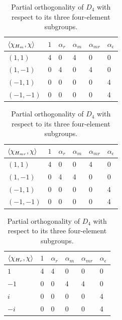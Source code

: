 \documentclass[two column]{article}
\begin{document}
\begin{table}[h]
\centering
\begin{tabular}{l|lllll}
  $\braket{\chi_{H_m}, \chi}$ & $1$ & $\alpha_{r}$ & $\alpha_{m}$ & $\alpha_{mr}$ & $\alpha_{\epsilon}$ \\ \hline
$(1,1)$ & 4   & 0            & 4             & 0               & 0                   \\ 
$ (1,-1)$ & 0   & 4            & 0             & 4               & 0                   \\ 
$(-1,1)$ & 0   & 0            & 0             & 0               & 4                   \\ 
$(-1,-1)$ & 0   & 0            & 0             & 0               & 4                   \\ 
\end{tabular}
\begin{tabular}{l|lllll}
  $\braket{\chi_{H_{mr}}, \chi}$ & $1$ & $\alpha_{r}$ & $\alpha_{m}$ & $\alpha_{mr}$ & $\alpha_{\epsilon}$ \\ \hline
$(1,1)$ & 4   & 0            & 0             & 4               & 0                   \\ 
$ (1,-1)$ & 0   & 4            & 4             & 0               & 0                   \\ 
$(-1,1)$ & 0   & 0            & 0             & 0               & 4                   \\ 
$(-1,-1)$ & 0   & 0            & 0             & 0               & 4                   \\ 
\end{tabular}
\begin{tabular}{l|lllll}
  $\braket{\chi_{H_r}, \chi}$ & $1$ & $\alpha_{r}$ & $\alpha_{m}$ & $\alpha_{mr}$ & $\alpha_{\epsilon}$ \\ \hline
$1$ & 4   & 4            & 0             & 0               & 0                   \\ 
$-1$ & 0   & 0            & 4             & 4               & 0                   \\ 
$i$ & 0   & 0            & 0             & 0               & 4                   \\ 
$-i$ & 0   & 0            & 0             & 0               & 4                   \\ 
\end{tabular}
\caption{Partial orthogonality of $D_4$ with respect to its three four-element subgroups.}
\label{tab:red_ch}
\end{table}
\end{document}
